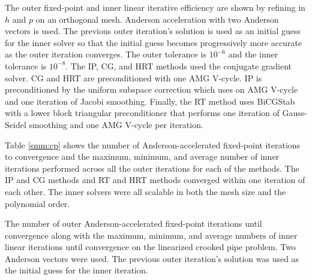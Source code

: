 \documentclass[../doc.tex]{subfiles}
\begin{document}
The outer fixed-point and inner linear iterative efficiency are shown by refining in $h$ and $p$ on an orthogonal mesh. Anderson acceleration with two Anderson vectors is used. The previous outer iteration's solution is used as an initial guess for the inner solver so that the initial guess becomes progressively more accurate as the outer iteration converges. The outer tolerance is $10^{-6}$ and the inner tolerance is $10^{-8}$. The IP, CG, and HRT methods used the conjugate gradient solver. CG and HRT are preconditioned with one AMG V-cycle. IP is preconditioned by the uniform subspace correction which uses on AMG V-cycle and one iteration of Jacobi smoothing. Finally, the RT method uses BiCGStab with a lower block triangular preconditioner that performs one iteration of Gauss-Seidel smoothing and one AMG V-cycle per iteration. 

Table \ref{smm:cp} shows the number of Anderson-accelerated fixed-point iterations to convergence and the maximum, minimum, and average number of inner iterations performed across all the outer iterations for each of the methods. The IP and CG methods and RT and HRT methods converged within one iteration of each other. The inner solvers were all scalable in both the mesh size and the polynomial order.  
\begin{table}
\centering
\caption{The number of outer Anderson-accelerated fixed-point iterations until convergence along with the maximum, minimum, and average numbers of inner linear iterations until convergence on the linearized crooked pipe problem. Two Anderson vectors were used. The previous outer iteration's solution was used as the initial guess for the inner iteration. }
\label{smm:cp}
\begin{adjustbox}{max width = \textwidth}

\end{adjustbox}
\end{table}
\end{document}
